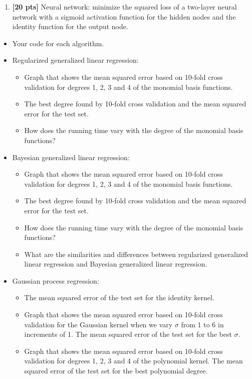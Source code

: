\documentclass{article}
\begin{document}
\begin{enumerate}
\begin{enumerate}
\item {\bf [20 pts]} Neural network: minimize the squared loss of a two-layer neural network with a sigmoid activation function
for the hidden nodes and the identity function for the output node.
\end{enumerate}

\begin{itemize}
\item Your code for each algorithm.
\item Regularized generalized linear regression: 
\begin{itemize}
\item Graph that shows the mean squared error based on 10-fold cross validation for degrees 1, 2, 3 and 4 of the monomial basis functions.
\item The best degree found by 10-fold cross validation and the mean squared error for the test set.
\item How does the running time vary with the degree of the monomial basis functions?
\end{itemize}
\item Bayesian generalized linear regression:
\begin{itemize}
\item Graph that shows the mean squared error based on 10-fold cross validation for degrees 1, 2, 3 and 4 of the monomial basis functions.
\item The best degree found by 10-fold cross validation and the mean squared error for the test set.
\item How does the running time vary with the degree of the monomial basis functions?
\item What are the similarities and differences between regularized generalized linear regression and Bayesian
generalized linear regression.
\end{itemize}
\item Gaussian process regression:
\begin{itemize}
\item The mean squared error of the test set for the identity kernel.
\item Graph that shows the mean squared error based on 10-fold cross validation for the Gaussian kernel when we vary $\sigma$ from 1 to 6 in increments of 1.  The mean squared error of the test set for the best $\sigma$.
\item Graph that shows the mean squared error based on 10-fold cross validation for degrees 1, 2, 3 and 4 of the polynomial kernel.  The mean squared error of the test set for the best polynomial degree.

\end{itemize}
\end{itemize}
\end{enumerate}
\end{document}
